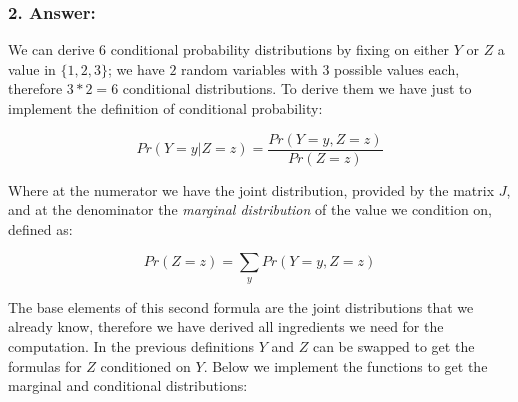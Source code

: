 \documentclass[
]{article}
\begin{document}
\hypertarget{answer-1}{%
\subsubsection{2. Answer:}\label{answer-1}}

We can derive \(6\) conditional probability distributions by fixing on
either \(Y\) or \(Z\) a value in \(\{1,2,3\}\); we have \(2\) random
variables with \(3\) possible values each, therefore \(3*2=6\)
conditional distributions. To derive them we have just to implement the
definition of conditional probability:

\[
Pr(Y = y | Z = z) = \frac{Pr(Y = y, Z = z)}{Pr(Z = z)}
\]

Where at the numerator we have the joint distribution, provided by the
matrix \(J\), and at the denominator the \emph{marginal distribution} of
the value we condition on, defined as:

\[
Pr(Z = z) = \sum_y Pr(Y = y, Z = z)
\]

The base elements of this second formula are the joint distributions
that we already know, therefore we have derived all ingredients we need
for the computation. In the previous definitions \(Y\) and \(Z\) can be
swapped to get the formulas for \(Z\) conditioned on \(Y\). Below we
implement the functions to get the marginal and conditional
distributions:
\end{document}

